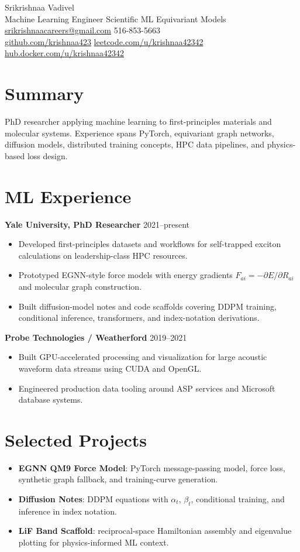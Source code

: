 \documentclass[10pt]{article}
\begin{document}
\begin{center}
{\LARGE Srikrishnaa Vadivel}\\
Machine Learning Engineer \textbar{} Scientific ML \textbar{} Equivariant Models\\
\href{mailto:srikrishnaacareers@gmail.com}{srikrishnaacareers@gmail.com} \textbar{} 516-853-5663\\
\href{https://github.com/krishnaa423}{github.com/krishnaa423} \textbar{}
\href{https://leetcode.com/u/krishnaa42342/}{leetcode.com/u/krishnaa42342} \textbar{}
\href{https://hub.docker.com/u/krishnaa42342}{hub.docker.com/u/krishnaa42342}
\end{center}
\section{Summary}
PhD researcher applying machine learning to first-principles materials and
molecular systems. Experience spans PyTorch, equivariant graph networks,
diffusion models, distributed training concepts, HPC data pipelines, and
physics-based loss design.
\section{ML Experience}
\textbf{Yale University, PhD Researcher} \hfill 2021--present
\begin{itemize}
\item Developed first-principles datasets and workflows for self-trapped
exciton calculations on leadership-class HPC resources.
\item Prototyped EGNN-style force models with energy gradients
$F_{ai}=-\partial E/\partial R_{ai}$ and molecular graph construction.
\item Built diffusion-model notes and code scaffolds covering DDPM training,
conditional inference, transformers, and index-notation derivations.
\end{itemize}
\textbf{Probe Technologies / Weatherford} \hfill 2019--2021
\begin{itemize}
\item Built GPU-accelerated processing and visualization for large acoustic
waveform data streams using CUDA and OpenGL.
\item Engineered production data tooling around ASP services and Microsoft
database systems.
\end{itemize}
\section{Selected Projects}
\begin{itemize}
\item \textbf{EGNN QM9 Force Model}: PyTorch message-passing model, force loss,
synthetic graph fallback, and training-curve generation.
\item \textbf{Diffusion Notes}: DDPM equations with $\alpha_t$, $\beta_t$,
conditional training, and inference in index notation.
\item \textbf{LiF Band Scaffold}: reciprocal-space Hamiltonian assembly and
eigenvalue plotting for physics-informed ML context.
\end{itemize}
\end{document}
